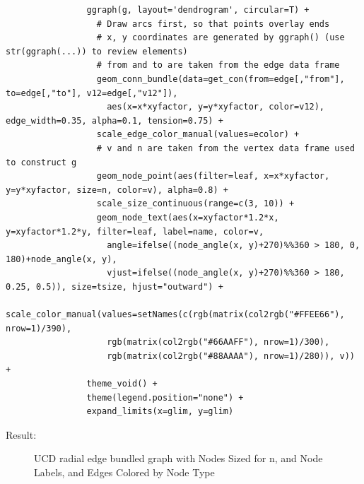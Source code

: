\documentclass[10pt, letterpaper]{article}
\begin{document}
\begin{spacing}{1.0}
\begin{verbatim}
                ggraph(g, layout='dendrogram', circular=T) +
                  # Draw arcs first, so that points overlay ends
                  # x, y coordinates are generated by ggraph() (use str(ggraph(...)) to review elements)
                  # from and to are taken from the edge data frame
                  geom_conn_bundle(data=get_con(from=edge[,"from"], to=edge[,"to"], v12=edge[,"v12"]),
                    aes(x=x*xyfactor, y=y*xyfactor, color=v12), edge_width=0.35, alpha=0.1, tension=0.75) +
                  scale_edge_color_manual(values=ecolor) +
                  # v and n are taken from the vertex data frame used to construct g
                  geom_node_point(aes(filter=leaf, x=x*xyfactor, y=y*xyfactor, size=n, color=v), alpha=0.8) +
                  scale_size_continuous(range=c(3, 10)) +
                  geom_node_text(aes(x=xyfactor*1.2*x, y=xyfactor*1.2*y, filter=leaf, label=name, color=v,
                    angle=ifelse((node_angle(x, y)+270)%%360 > 180, 0, 180)+node_angle(x, y),
                    vjust=ifelse((node_angle(x, y)+270)%%360 > 180, 0.25, 0.5)), size=tsize, hjust="outward") +
                  scale_color_manual(values=setNames(c(rgb(matrix(col2rgb("#FFEE66"), nrow=1)/390),
                    rgb(matrix(col2rgb("#66AAFF"), nrow=1)/300),
                    rgb(matrix(col2rgb("#88AAAA"), nrow=1)/280)), v)) +
                theme_void() +
                theme(legend.position="none") +
                expand_limits(x=glim, y=glim)
\end{verbatim}
\normalsize

Result:

\begin{figure}[H]
    \centering
    \caption{UCD radial edge bundled graph with Nodes Sized for n, and Node Labels, and Edges Colored by Node Type}
    \label{fg:edgebund2}
\end{figure}


\end{spacing}
\end{document}
